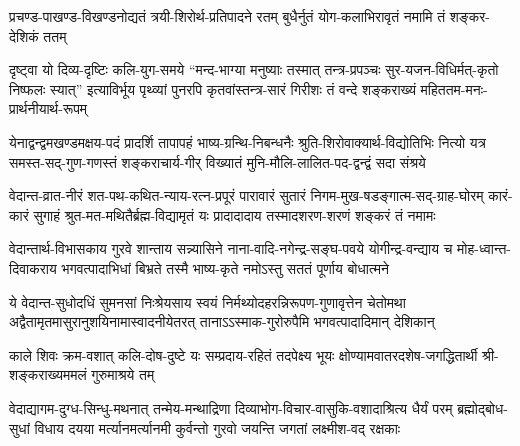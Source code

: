 
\twolineshloka
{प्रचण्ड-पाखण्ड-विखण्डनोद्यतं त्रयी-शिरोर्थ-प्रतिपादने रतम्}
{बुधैर्नुतं योग-कलाभिरावृतं नमामि तं शङ्कर-देशिकं ततम्}


\fourlineindentedshloka
{दृष्ट्वा यो दिव्य-दृष्टिः कलि-युग-समये “मन्द-भाग्या मनुष्याः}
{तस्मात् तन्त्र-प्रपञ्चः सुर-यजन-विधिर्मत्-कृतो निष्फलः स्यात्”}
{इत्याविर्भूय पृथ्व्यां पुनरपि कृतवांस्तन्त्र-सारं गिरीशः}
{तं वन्दे शङ्कराख्यं महिततम-मनः-प्रार्थनीयार्थ-रूपम्}


\fourlineindentedshloka
{येनाद्वन्द्वमखण्डमक्षय-पदं प्रादर्शि तापापहं}
{भाष्य-ग्रन्थि-निबन्धनैः श्रुति-शिरोवाक्यार्थ-विद्योतिभिः}
{नित्यो यत्र समस्त-सद्-गुण-गणस्तं शङ्कराचार्य-गीर्}
{विख्यातं मुनि-मौलि-लालित-पद-द्वन्द्वं सदा संश्रये}


\fourlineindentedshloka
{वेदान्त-व्रात-नीरं शत-पथ-कथित-न्याय-रत्न-प्रपूरं}
{पारावारं सुतारं निगम-मुख-षडङ्गात्म-सद्-ग्राह-घोरम्}
{कारं-कारं सुगाहं श्रुत-मत-मथितैर्ब्रह्म-विद्यामृतं यः}
{प्रादादादाय तस्मादशरण-शरणं शङ्करं तं नमामः}


\fourlineindentedshloka
{वेदान्तार्थ-विभासकाय गुरवे शान्ताय सन्न्यासिने}
{नाना-वादि-नगेन्द्र-सङ्घ-पवये योगीन्द्र-वन्द्याय च}
{मोह-ध्वान्त-दिवाकराय भगवत्पादाभिधां बिभ्रते}
{तस्मै भाष्य-कृते नमोऽस्तु सततं पूर्णाय बोधात्मने}


\fourlineindentedshloka
{ये वेदान्त-सुधोदधिं सुमनसां निःश्रेयसाय स्वयं}
{निर्मथ्योदहरन्निरूपण-गुणावृत्तेन चेतोमथा}
{अद्वैतामृतमासुरानुशयिनामास्वादनीयेतरत्}
{तानाऽऽस्माक-गुरोरुपैमि भगवत्पादादिमान् देशिकान्}


\fourlineindentedshloka
{काले शिवः क्रम-वशात् कलि-दोष-दुष्टे}
{यः सम्प्रदाय-रहितं तदपेक्ष्य भूयः}
{क्षोण्यामवातरदशेष-जगद्धितार्थी}
{श्री-शङ्कराख्यममलं गुरुमाश्रये तम्}


\fourlineindentedshloka
{वेदाद्यागम-दुग्ध-सिन्धु-मथनात् तन्मेय-मन्थाद्रिणा}
{दिव्याभोग-विचार-वासुकि-वशादाश्रित्य धैर्यं परम्}
{ब्रह्मोद्बोध-सुधां विधाय दयया मर्त्यानमर्त्यानमी}
{कुर्वन्तो गुरवो जयन्ति जगतां लक्ष्मीश-वद् रक्षकाः}

